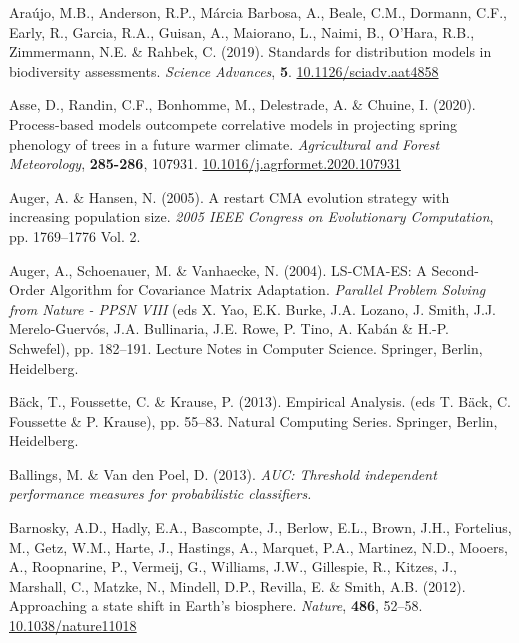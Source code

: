 \documentclass[11pt,]{article}
\newlength{\cslhangindent}
\newenvironment{CSLReferences}[2] %
 {%
  \setlength{\parindent}{0pt}
  \ifodd #1 \everypar{\setlength{\hangindent}{\cslhangindent}}\ignorespaces\fi
  \ifnum #2 > 0
  \setlength{\parskip}{#2\baselineskip}
  \fi
 }%
 {}
\begin{document}
\hypertarget{refs}{}
\begin{CSLReferences}{1}{0}
\leavevmode{}%
Araújo, M.B., Anderson, R.P., Márcia Barbosa, A., Beale, C.M., Dormann,
C.F., Early, R., Garcia, R.A., Guisan, A., Maiorano, L., Naimi, B.,
O'Hara, R.B., Zimmermann, N.E. \& Rahbek, C. (2019). Standards for
distribution models in biodiversity assessments. \emph{Science
Advances}, \textbf{5}.
\href{https://doi.org/10.1126/sciadv.aat4858}{10.1126/sciadv.aat4858}

\leavevmode{}%
Asse, D., Randin, C.F., Bonhomme, M., Delestrade, A. \& Chuine, I.
(2020). Process-based models outcompete correlative models in projecting
spring phenology of trees in a future warmer climate. \emph{Agricultural
and Forest Meteorology}, \textbf{285-286}, 107931.
\href{https://doi.org/10.1016/j.agrformet.2020.107931}{10.1016/j.agrformet.2020.107931}

\leavevmode{}%
Auger, A. \& Hansen, N. (2005). A restart {CMA} evolution strategy with
increasing population size. \emph{2005 {IEEE} {Congress} on
{Evolutionary} {Computation}}, pp. 1769--1776 Vol. 2.

\leavevmode{}%
Auger, A., Schoenauer, M. \& Vanhaecke, N. (2004). {LS}-{CMA}-{ES}: {A}
{Second}-{Order} {Algorithm} for {Covariance} {Matrix} {Adaptation}.
\emph{Parallel {Problem} {Solving} from {Nature} - {PPSN} {VIII}} (eds
X. Yao, E.K. Burke, J.A. Lozano, J. Smith, J.J. Merelo-Guervós, J.A.
Bullinaria, J.E. Rowe, P. Tino, A. Kabán \& H.-P. Schwefel), pp.
182--191. Lecture {Notes} in {Computer} {Science}. Springer, Berlin,
Heidelberg.

\leavevmode{}%
Bäck, T., Foussette, C. \& Krause, P. (2013). Empirical {Analysis}. (eds
T. Bäck, C. Foussette \& P. Krause), pp. 55--83. Natural {Computing}
{Series}. Springer, Berlin, Heidelberg.

\leavevmode{}%
Ballings, M. \& Van den Poel, D. (2013). \emph{AUC: Threshold
independent performance measures for probabilistic classifiers.}

\leavevmode{}%
Barnosky, A.D., Hadly, E.A., Bascompte, J., Berlow, E.L., Brown, J.H.,
Fortelius, M., Getz, W.M., Harte, J., Hastings, A., Marquet, P.A.,
Martinez, N.D., Mooers, A., Roopnarine, P., Vermeij, G., Williams, J.W.,
Gillespie, R., Kitzes, J., Marshall, C., Matzke, N., Mindell, D.P.,
Revilla, E. \& Smith, A.B. (2012). Approaching a state shift in
{Earth}'s biosphere. \emph{Nature}, \textbf{486}, 52--58.
\href{https://doi.org/10.1038/nature11018}{10.1038/nature11018}


\end{CSLReferences}
\end{document}

